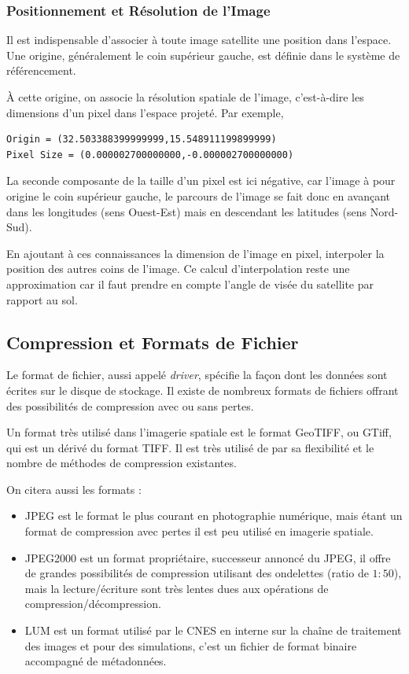 \documentclass[a4paper, 11pt]{report}
\begin{document}
\subsubsection{Positionnement et Résolution de l'Image}
Il est indispensable d'associer à toute image satellite une position dans l'espace. Une origine, généralement le coin supérieur gauche, est définie dans le système de référencement.

À cette origine, on associe la résolution spatiale de l'image, c'est-à-dire les dimensions d'un pixel dans l'espace projeté.
Par exemple,
\begin{verbatim}
Origin = (32.503388399999999,15.548911199899999)
Pixel Size = (0.000002700000000,-0.000002700000000)
\end{verbatim}
La seconde composante de la taille d'un pixel est ici négative, car l'image à pour origine le coin supérieur gauche, le parcours de l'image se fait donc en avançant dans les longitudes (sens Ouest-Est) mais en descendant les latitudes (sens Nord-Sud).

En ajoutant à ces connaissances la dimension de l'image en pixel, interpoler la position des autres coins de l'image. Ce calcul d'interpolation reste une approximation car il faut prendre en compte l'angle de visée du satellite par rapport au sol.

\subsection{Compression et Formats de Fichier}
Le format de fichier, aussi appelé \emph{driver}, spécifie la façon dont les données sont écrites sur le disque de stockage.
Il existe de nombreux formats de fichiers offrant des possibilités de compression avec ou sans pertes.

Un format très utilisé dans l'imagerie spatiale est le format GeoTIFF, ou GTiff, qui est un dérivé du format TIFF. Il est très utilisé de par sa flexibilité et le nombre de méthodes de compression existantes.

On citera aussi les formats :
\begin{itemize}
	\item JPEG est le format le plus courant en photographie numérique, mais étant un format de compression avec pertes il est peu utilisé en imagerie spatiale.
	\item JPEG2000 est un format propriétaire, successeur annoncé du JPEG, il offre de grandes possibilités de compression utilisant des ondelettes (ratio de $1:50$), mais la lecture/écriture sont très lentes dues aux opérations de compression/décompression.
	\item LUM est un format utilisé par le CNES en interne sur la chaîne de traitement des images et pour des simulations, c'est un fichier de format binaire accompagné de métadonnées.
\end{itemize}
\end{document}
